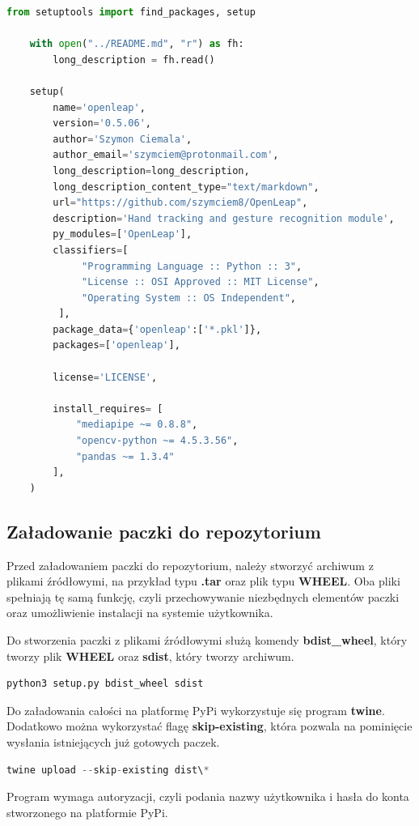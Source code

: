\begin{lstlisting}[language=python, style=programming, captionpos=b, caption={Sprawdzenie poprawności}]
    from setuptools import find_packages, setup

    with open("../README.md", "r") as fh:
        long_description = fh.read()
    
    setup(
        name='openleap', 
        version='0.5.06',
        author='Szymon Ciemala',
        author_email='szymciem@protonmail.com',
        long_description=long_description,
        long_description_content_type="text/markdown",
        url="https://github.com/szymciem8/OpenLeap",
        description='Hand tracking and gesture recognition module', 
        py_modules=['OpenLeap'], 
        classifiers=[
             "Programming Language :: Python :: 3",
             "License :: OSI Approved :: MIT License",
             "Operating System :: OS Independent",
         ],
        package_data={'openleap':['*.pkl']},
        packages=['openleap'],
    
        license='LICENSE',
    
        install_requires= [
            "mediapipe ~= 0.8.8",
            "opencv-python ~= 4.5.3.56", 
            "pandas ~= 1.3.4"
        ],    
    )
\end{lstlisting}

\subsection{Załadowanie paczki do repozytorium}

\quad Przed załadowaniem paczki do repozytorium, należy stworzyć archiwum z plikami źródłowymi, na przykład typu \textbf{.tar} oraz plik typu \textbf{WHEEL}. Oba pliki spełniają tę samą funkcję, czyli przechowywanie niezbędnych elementów paczki oraz umożliwienie instalacji na systemie użytkownika.

\quad Do stworzenia paczki z plikami źródłowymi służą komendy \textbf{bdist\_wheel}, który tworzy plik \textbf{WHEEL} oraz \textbf{sdist}, który tworzy archiwum. 

\begin{lstlisting}[language=python, style=command, captionpos=b, caption={Przygotowanie plików źródłowych}]
python3 setup.py bdist_wheel sdist
\end{lstlisting}

\quad Do załadowania całości na platformę PyPi wykorzystuje się program \textbf{twine}. Dodatkowo można wykorzystać flagę \textbf{skip-existing}, która pozwala na pominięcie wysłania istniejących już gotowych paczek.

\begin{lstlisting}[language=python, style=command, captionpos=b, caption={Wysłanie paczki na repozytorium}]
twine upload --skip-existing dist\*
\end{lstlisting}

\quad Program wymaga autoryzacji, czyli podania nazwy użytkownika i hasła do konta stworzonego na platformie PyPi. 